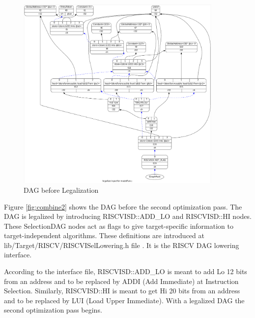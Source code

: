 \begin{figure}
    \centering
    \includegraphics[width=0.9\textwidth]{path_instruction/madd_dag_legalize.png}
    \caption{DAG before Legalization}
    \label{fig:legalize}
\end{figure}

Figure \ref{fig:combine2} shows the DAG before the second optimization pass. The DAG is legalized by introducing RISCVISD::ADD\_LO and RISCVISD::HI nodes. These SelectionDAG nodes act as flags to give target-specific information to target-independent algorithms. These definitions are introduced at lib/Target/RISCV/RISCVISelLowering.h file \cite{riscvIselh}. It is the RISCV DAG lowering interface. 
\par
According to the interface file, RISCVISD::ADD\_LO is meant to add Lo 12 bits from an address and to be replaced by ADDI (Add Immediate) at Instruction Selection. Similarly, RISCVISD::HI is meant to get Hi 20 bits from an address and to be replaced by LUI (Load Upper Immediate). With a legalized DAG the second optimization pass begins.
